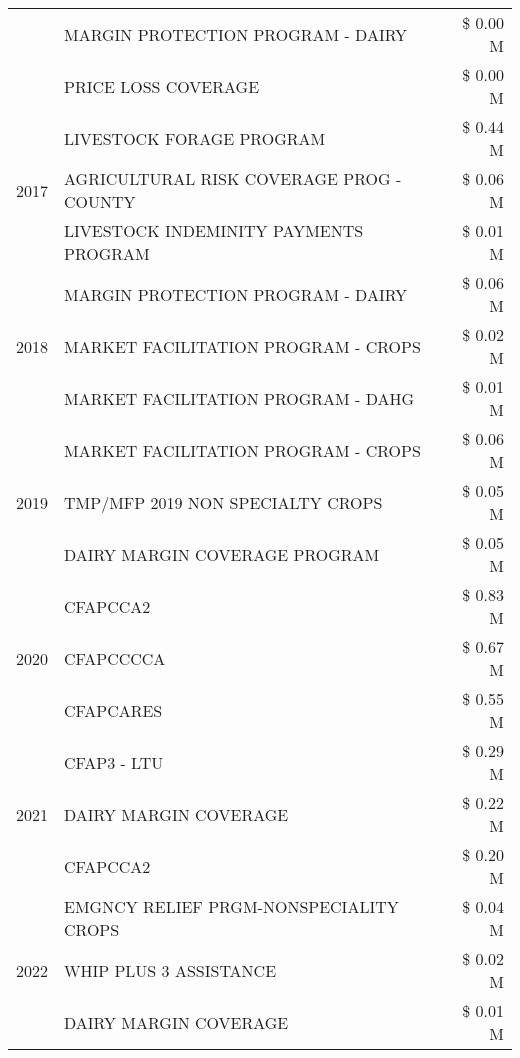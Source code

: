 \begin{tabular}{llr}
 & MARGIN PROTECTION PROGRAM - DAIRY & \$ 0.00 M \\
 & PRICE LOSS COVERAGE & \$ 0.00 M \\
\cline{1-3}
\multirow[t]{3}{*}{2017} & LIVESTOCK FORAGE PROGRAM & \$ 0.44 M \\
 & AGRICULTURAL RISK COVERAGE PROG - COUNTY & \$ 0.06 M \\
 & LIVESTOCK INDEMINITY PAYMENTS PROGRAM & \$ 0.01 M \\
\cline{1-3}
\multirow[t]{3}{*}{2018} & MARGIN PROTECTION PROGRAM - DAIRY & \$ 0.06 M \\
 & MARKET FACILITATION PROGRAM - CROPS & \$ 0.02 M \\
 & MARKET FACILITATION PROGRAM - DAHG & \$ 0.01 M \\
\cline{1-3}
\multirow[t]{3}{*}{2019} & MARKET FACILITATION PROGRAM - CROPS & \$ 0.06 M \\
 & TMP/MFP 2019 NON SPECIALTY CROPS & \$ 0.05 M \\
 & DAIRY MARGIN COVERAGE PROGRAM & \$ 0.05 M \\
\cline{1-3}
\multirow[t]{3}{*}{2020} & CFAPCCA2 & \$ 0.83 M \\
 & CFAPCCCCA & \$ 0.67 M \\
 & CFAPCARES & \$ 0.55 M \\
\cline{1-3}
\multirow[t]{3}{*}{2021} & CFAP3 - LTU & \$ 0.29 M \\
 & DAIRY MARGIN COVERAGE & \$ 0.22 M \\
 & CFAPCCA2 & \$ 0.20 M \\
\cline{1-3}
\multirow[t]{3}{*}{2022} & EMGNCY RELIEF PRGM-NONSPECIALITY CROPS & \$ 0.04 M \\
 & WHIP PLUS 3 ASSISTANCE & \$ 0.02 M \\
 & DAIRY MARGIN COVERAGE & \$ 0.01 M \\
\cline{1-3}
\bottomrule
\end{tabular}
